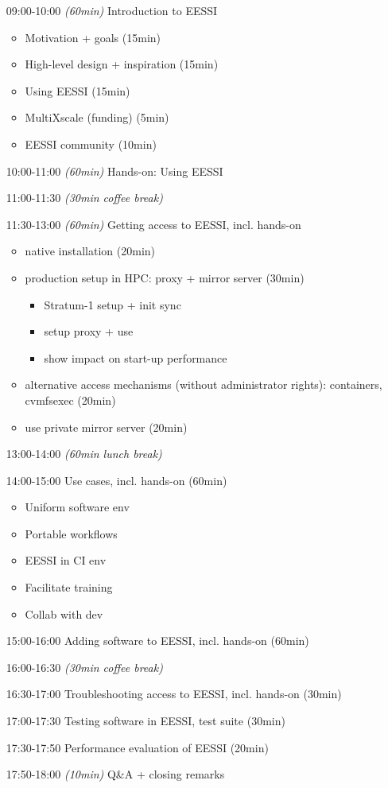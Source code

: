 \begin{itemize}[style=standard, labelwidth=1.9cm]
    \item [09:00-10:00] \emph{(60min)} Introduction to EESSI
    \begin{itemize}
        \item Motivation + goals (15min)
        \item High-level design + inspiration (15min)
        \item Using EESSI (15min)
        \item MultiXscale (funding) (5min)
        \item EESSI community (10min)
    \end{itemize}
    \item [10:00-11:00] \emph{(60min)} Hands-on: Using EESSI
    \item [11:00-11:30] \emph{(30min coffee break)}
    \item [11:30-13:00] \emph{(60min)} Getting access to EESSI, incl. hands-on
    \begin{itemize}
        \item native installation (20min)
        \item production setup in HPC: proxy + mirror server (30min)
        \begin{itemize}
            \item Stratum-1 setup + init sync
            \item setup proxy + use
            \item show impact on start-up performance
        \end{itemize}
        \item alternative access mechanisms (without administrator rights): containers, cvmfsexec (20min)
        \item use private mirror server (20min)
    \end{itemize}
    \item [13:00-14:00] \emph{(60min lunch break)}
    \item [14:00-15:00] Use cases, incl. hands-on (60min)
    \begin{itemize}
        \item Uniform software env
        \item Portable workflows
        \item EESSI in CI env
        \item Facilitate training
        \item Collab with dev
    \end{itemize}
    \item [15:00-16:00] Adding software to EESSI, incl. hands-on (60min)
    \item [16:00-16:30] \emph{(30min coffee break)}
    \item [16:30-17:00] Troubleshooting access to EESSI, incl. hands-on (30min)
    \item [17:00-17:30] Testing software in EESSI, test suite (30min)
    \item [17:30-17:50] Performance evaluation of EESSI (20min)
    \item [17:50-18:00] \emph{(10min)} Q\&A + closing remarks


\end{itemize}
